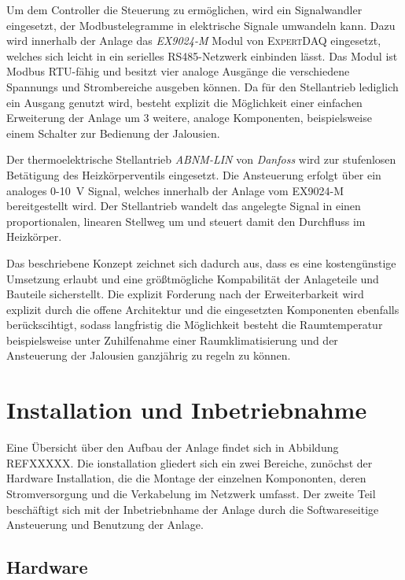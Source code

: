 Um dem Controller die Steuerung zu ermöglichen, wird ein Signalwandler eingesetzt, der Modbustelegramme in elektrische Signale umwandeln kann. Dazu wird innerhalb der Anlage das \textit{EX9024-M} Modul von \textsc{ExpertDAQ} eingesetzt, welches sich leicht in ein serielles RS485-Netzwerk einbinden lässt. Das Modul ist Modbus RTU-fähig und besitzt vier analoge Ausgänge die verschiedene Spannungs und Strombereiche ausgeben können. Da für den Stellantrieb lediglich ein Ausgang genutzt wird, besteht explizit die Möglichkeit einer einfachen Erweiterung der Anlage um 3 weitere, analoge Komponenten, beispielsweise einem Schalter zur Bedienung  der Jalousien.

Der thermoelektrische Stellantrieb \textit{ABNM-LIN} von \textit{Danfoss} wird zur stufenlosen Betätigung des Heizkörperventils eingesetzt. Die Ansteuerung erfolgt über ein analoges 0-10~V Signal, welches innerhalb der Anlage vom EX9024-M bereitgestellt wird. Der Stellantrieb wandelt das angelegte Signal in einen proportionalen, linearen Stellweg um und steuert damit den Durchfluss im Heizkörper.

Das beschriebene Konzept zeichnet sich dadurch aus, dass es eine kostengünstige Umsetzung erlaubt und eine größtmögliche Kompabilität der Anlageteile und Bauteile sicherstellt. Die explizit Forderung nach der Erweiterbarkeit wird explizit durch die offene Architektur und die eingesetzten Komponenten ebenfalls berückscihtigt, sodass langfristig die Möglichkeit besteht die Raumtemperatur beispielsweise unter Zuhilfenahme einer Raumklimatisierung und der Ansteuerung der Jalousien ganzjährig zu regeln zu können.

\section{Installation und Inbetriebnahme}

Eine Übersicht über den Aufbau der Anlage findet sich in Abbildung REFXXXXX. Die ionstallation gliedert sich ein zwei Bereiche, zunöchst der Hardware Installation, die die  Montage der einzelnen Kompononten, deren Stromversorgung und die Verkabelung im Netzwerk umfasst.
Der zweite Teil beschäftigt sich mit der Inbetriebnhame der Anlage durch die Softwareseitige Ansteuerung und Benutzung der Anlage.


\subsection{Hardware}

